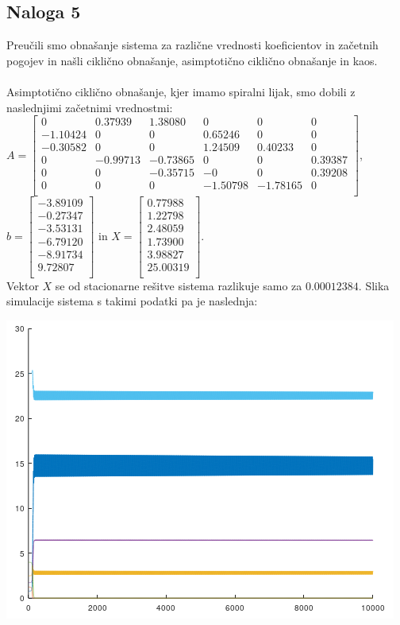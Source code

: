 \documentclass[a4paper, 12pt]{article}
\begin{document}
\subsection{Naloga 5}
Preučili smo obnašanje sistema za različne vrednosti koeficientov in začetnih pogojev
in našli ciklično obnašanje, asimptotično ciklično obnašanje in kaos.\\
\\
Asimptotično ciklično obnašanje, kjer imamo spiralni lijak, smo dobili z naslednjimi začetnimi vrednostmi:\\
$ A =
\begin{bmatrix}
	0 & 0.37939 & 1.38080 & 0 & 0 & 0 \\
	-1.10424 & 0 & 0 & 0.65246 & 0 & 0 \\
	-0.30582 & 0 & 0 & 1.24509 & 0.40233 & 0 \\
	0 & -0.99713 & -0.73865 & 0 & 0 & 0.39387 \\
	0 & 0 & -0.35715 & -0 & 0 & 0.39208 \\
	0 & 0 & 0 & -1.50798 & -1.78165 & 0 \\
\end{bmatrix} $, \\
$ b =
\begin{bmatrix}
	-3.89109 \\
	-0.27347 \\
	-3.53131 \\
	-6.79120 \\
	-8.91734 \\
	9.72807 \\
\end{bmatrix} $ in
$ X =
\begin{bmatrix}
	0.77988 \\
	1.22798 \\
	2.48059 \\
	1.73900 \\
	3.98827 \\
	25.00319 \\
\end{bmatrix} $. \\
Vektor $ X $ se od stacionarne rešitve sistema razlikuje samo za $ 0.00012384 $. Slika simulacije
sistema s takimi podatki pa je naslednja:
\begin{center}
	\includegraphics{asimptotic_cyclic_sink.png}
\end{center}
\end{document}
